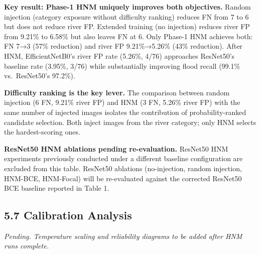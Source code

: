 \documentclass[
  11pt,
]{article}
\begin{document}
\textbf{Key result: Phase-1 HNM uniquely improves both objectives.}
Random injection (category exposure without difficulty ranking) reduces
FN from 7 to 6 but does not reduce river FP. Extended training (no
injection) reduces river FP from 9.21\% to 6.58\% but also leaves FN at
6. Only Phase-1 HNM achieves both: FN 7→3 (57\% reduction) and river FP
9.21\%→5.26\% (43\% reduction). After HNM, EfficientNetB0's river FP
rate (5.26\%, 4/76) approaches ResNet50's baseline rate (3.95\%, 3/76)
while substantially improving flood recall (99.1\% vs.~ResNet50's
97.2\%).

\textbf{Difficulty ranking is the key lever.} The comparison between
random injection (6 FN, 9.21\% river FP) and HNM (3 FN, 5.26\% river FP)
with the same number of injected images isolates the contribution of
probability-ranked candidate selection. Both inject images from the
river category; only HNM selects the hardest-scoring ones.

\textbf{ResNet50 HNM ablations pending re-evaluation.} ResNet50 HNM
experiments previously conducted under a different baseline
configuration are excluded from this table. ResNet50 ablations
(no-injection, random injection, HNM-BCE, HNM-Focal) will be
re-evaluated against the corrected ResNet50 BCE baseline reported in
Table 1.

\subsection{5.7 Calibration Analysis}\label{calibration-analysis}

\emph{Pending. Temperature scaling and reliability diagrams to be added
after HNM runs complete.}
\end{document}
